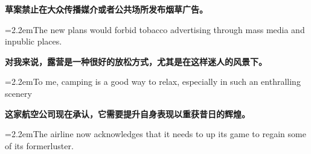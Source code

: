\documentclass[11pt,a4paper]{article}
\newcommand{\num}[1]{\makebox[1.9em][r]{#1.}\hspace{0.3em}}
\begin{document}
\num{5}\textbf{草案禁止在大众传播媒介或者公共场所发布烟草广告。}

\vspace{0.15em}

\noindent\hangindent=2.2em\hspace{2.2em}The new plans would forbid tobacco advertising through mass media and inpublic places.

\num{6}\textbf{对我来说，露营是一种很好的放松方式，尤其是在这样迷人的风景下。}

\vspace{0.15em}

\noindent\hangindent=2.2em\hspace{2.2em}To me, camping is a good way to relax, especially in such an enthralling scenery

\num{7}\textbf{这家航空公司现在承认，它需要提升自身表现以重获昔日的辉煌。}

\vspace{0.15em}

\noindent\hangindent=2.2em\hspace{2.2em}The airline now acknowledges that it needs to up its game to regain some of its formerluster.
\end{document}
